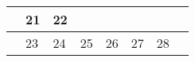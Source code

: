 {\begin{tabularx}{\linewidth}{|l!{\vrule width \myLenLineThicknessThick}*{7}{@{}X@{}|}}
       & 
    
      
      
        \begin{minipage}[t]{6mm}\centering{}21\end{minipage}
      
       & 
    
      
      
        \begin{minipage}[t]{6mm}\centering{}22\end{minipage}
      
      
        \\  \hline 
      
    
  
  
  
  \hyperlink{week-2027-34}{} &
    
      
      
        \begin{minipage}[t]{6mm}\centering{}23\end{minipage}
      
       & 
    
      
      
        \begin{minipage}[t]{6mm}\centering{}24\end{minipage}
      
       & 
    
      
      
        \begin{minipage}[t]{6mm}\centering{}25\end{minipage}
      
       & 
    
      
      
        \begin{minipage}[t]{6mm}\centering{}26\end{minipage}
      
       & 
    
      
      
        \begin{minipage}[t]{6mm}\centering{}27\end{minipage}
      
       & 
    
      
      
        \begin{minipage}[t]{6mm}\centering{}28\end{minipage}
      

\end{tabularx}}
